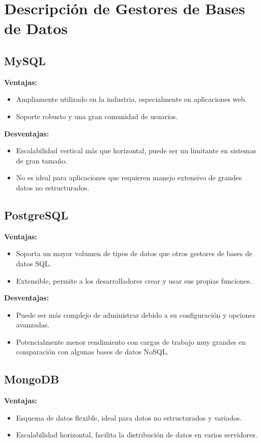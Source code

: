 \documentclass{article}
\begin{document}
\newpage

\section{Descripción de Gestores de Bases de Datos}

\subsection{MySQL}
\textbf{Ventajas:}
\begin{itemize}
  \item Ampliamente utilizado en la industria, especialmente en aplicaciones web.
  \item Soporte robusto y una gran comunidad de usuarios.
\end{itemize}

\textbf{Desventajas:}
\begin{itemize}
  \item Escalabilidad vertical más que horizontal, puede ser un limitante en sistemas de gran tamaño.
  \item No es ideal para aplicaciones que requieren manejo extensivo de grandes datos no estructurados.
\end{itemize}

\subsection{PostgreSQL}
\textbf{Ventajas:}
\begin{itemize}
  \item Soporta un mayor volumen de tipos de datos que otros gestores de bases de datos SQL.
  \item Extensible, permite a los desarrolladores crear y usar sus propias funciones.
\end{itemize}

\textbf{Desventajas:}
\begin{itemize}
  \item Puede ser más complejo de administrar debido a su configuración y opciones avanzadas.
  \item Potencialmente menor rendimiento con cargas de trabajo muy grandes en comparación con algunas bases de datos NoSQL.
\end{itemize}

\subsection{MongoDB}
\textbf{Ventajas:}
\begin{itemize}
  \item Esquema de datos flexible, ideal para datos no estructurados y variados.
  \item Escalabilidad horizontal, facilita la distribución de datos en varios servidores.
\end{itemize}
\end{document}
